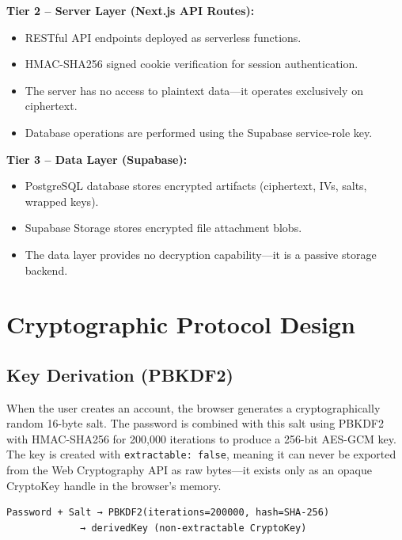 \textbf{Tier 2 -- Server Layer (Next.js API Routes):}
\begin{itemize}
    \item RESTful API endpoints deployed as serverless functions.
    \item HMAC-SHA256 signed cookie verification for session authentication.
    \item The server has no access to plaintext data---it operates exclusively on ciphertext.
    \item Database operations are performed using the Supabase service-role key.
\end{itemize}

\textbf{Tier 3 -- Data Layer (Supabase):}
\begin{itemize}
    \item PostgreSQL database stores encrypted artifacts (ciphertext, IVs, salts, wrapped keys).
    \item Supabase Storage stores encrypted file attachment blobs.
    \item The data layer provides no decryption capability---it is a passive storage backend.
\end{itemize}



\section{Cryptographic Protocol Design}

\subsection{Key Derivation (PBKDF2)}

When the user creates an account, the browser generates a cryptographically random 16-byte salt. The password is combined with this salt using PBKDF2 with HMAC-SHA256 for 200,000 iterations to produce a 256-bit AES-GCM key. The key is created with \texttt{extractable: false}, meaning it can never be exported from the Web Cryptography API as raw bytes---it exists only as an opaque CryptoKey handle in the browser's memory.

\begin{verbatim}
Password + Salt → PBKDF2(iterations=200000, hash=SHA-256)
             → derivedKey (non-extractable CryptoKey)
\end{verbatim}

